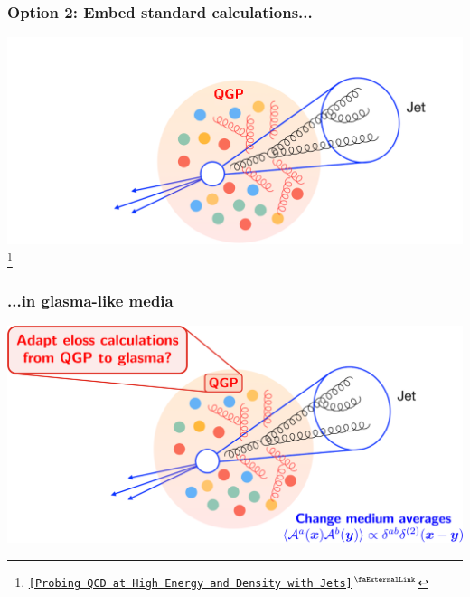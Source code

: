\documentclass[aspectratio=169,11pt,usenames,dvipsnames]{beamer}
\renewcommand{\thefootnote}{\color{customblue}\faPaperPlaneO}
\newcommand\blfootnote[1]{%
  \begingroup
  \renewcommand\thefootnote{}\footnote{#1}%
  \addtocounter{footnote}{-1}%
  \endgroup
}
\begin{document}
\begin{frame}[noframenumbering]
    \frametitle{{\normalsize\color{jyured}\bfseries\sffamily Option 2: }Embed standard calculations...}
    \hspace{20pt}
        \includegraphics[width=0.8\paperwidth]{images/probingQCDqgp.png}
    \blfootnote{\scriptsize \href{https://www.int.washington.edu/programs-and-workshops/21r-2b}{{\color{blue}\texttt{[Probing QCD at High Energy and Density with Jets]$^\text{\scalebox{0.9}{\faExternalLink}}$}}}}
\end{frame}


\begin{frame}[noframenumbering]
    \frametitle{...in glasma-like media}
    \hspace{20pt}
        \includegraphics[width=0.8\paperwidth]{images/probingQCDglasma_v2.png}
\end{frame}
\end{document}
